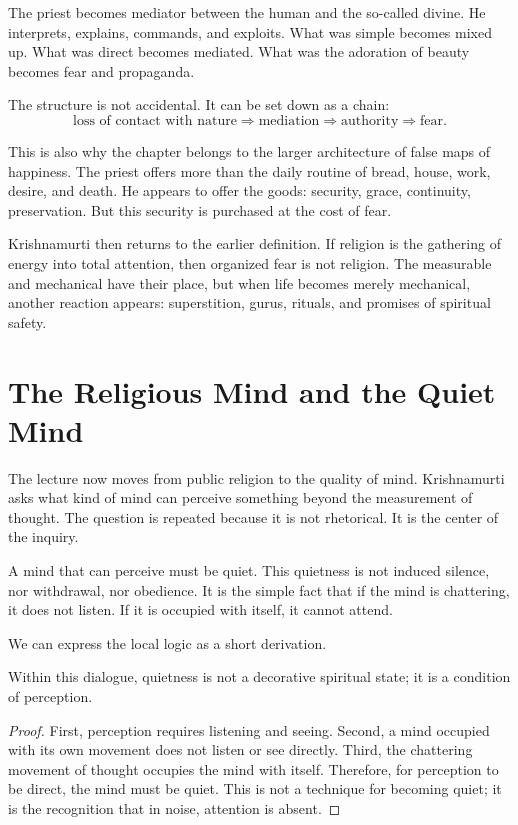 The priest becomes mediator between the human and the so-called divine. He interprets, explains, commands, and exploits. What was simple becomes mixed up. What was direct becomes mediated. What was the adoration of beauty becomes fear and propaganda.

The structure is not accidental. It can be set down as a chain:
\begin{equation}
\text{loss of contact with nature}
\Rightarrow
\text{mediation}
\Rightarrow
\text{authority}
\Rightarrow
\text{fear}.
\end{equation}

This is also why the chapter belongs to the larger architecture of false maps of happiness. The priest offers more than the daily routine of bread, house, work, desire, and death. He appears to offer the goods: security, grace, continuity, preservation. But this security is purchased at the cost of fear.

Krishnamurti then returns to the earlier definition. If religion is the gathering of energy into total attention, then organized fear is not religion. The measurable and mechanical have their place, but when life becomes merely mechanical, another reaction appears: superstition, gurus, rituals, and promises of spiritual safety.

\section{The Religious Mind and the Quiet Mind}

The lecture now moves from public religion to the quality of mind. Krishnamurti asks what kind of mind can perceive something beyond the measurement of thought. The question is repeated because it is not rhetorical. It is the center of the inquiry.

A mind that can perceive must be quiet. This quietness is not induced silence, nor withdrawal, nor obedience. It is the simple fact that if the mind is chattering, it does not listen. If it is occupied with itself, it cannot attend.

We can express the local logic as a short derivation.

\begin{proposition}
Within this dialogue, quietness is not a decorative spiritual state; it is a condition of perception.
\end{proposition}

\begin{proof}
First, perception requires listening and seeing. Second, a mind occupied with its own movement does not listen or see directly. Third, the chattering movement of thought occupies the mind with itself. Therefore, for perception to be direct, the mind must be quiet. This is not a technique for becoming quiet; it is the recognition that in noise, attention is absent.
\end{proof}

